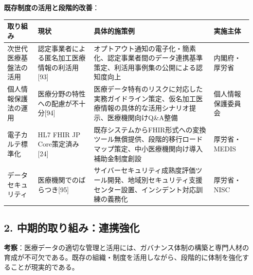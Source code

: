 \documentclass[
  a4paper,
  a4paper,
  11pt]{ltjsbook}
\begin{document}
\textbf{既存制度の活用と段階的改善}：

\begin{longtable}[]{@{}
  >{\raggedright\arraybackslash}p{}
  >{\raggedright\arraybackslash}p{}
  >{\raggedright\arraybackslash}p{}
  >{\raggedright\arraybackslash}p{}@{}}
\toprule\noalign{}
\begin{minipage}[b]{\linewidth}\raggedright
取り組み
\end{minipage} & \begin{minipage}[b]{\linewidth}\raggedright
現状
\end{minipage} & \begin{minipage}[b]{\linewidth}\raggedright
具体的施策例
\end{minipage} & \begin{minipage}[b]{\linewidth}\raggedright
実施主体
\end{minipage} \\
\midrule\noalign{}
\endhead
\bottomrule\noalign{}
\endlastfoot
次世代医療基盤法の活用 &
認定事業者による匿名加工医療情報の利活用{[}93{]} &
オプトアウト通知の電子化・簡素化、認定事業者間のデータ連携基準策定、利活用事例集の公開による認知度向上
& 内閣府・厚労省 \\
個人情報保護法の運用 & 医療分野の特性への配慮が不十分{[}94{]} &
医療データ特有のリスクに対応した実務ガイドライン策定、仮名加工医療情報の具体的な活用シナリオ提示、医療機関向けQ\&A整備
& 個人情報保護委員会 \\
電子カルテ標準化 & HL7 FHIR JP Core策定済み{[}24{]} &
既存システムからFHIR形式への変換ツール無償提供、段階的移行ロードマップ策定、中小医療機関向け導入補助金制度創設
& 厚労省・MEDIS \\
データセキュリティ & 医療機関でのばらつき{[}95{]} &
サイバーセキュリティ成熟度評価ツール開発、地域別セキュリティ支援センター設置、インシデント対応訓練の義務化
& 厚労省・NISC \\
\end{longtable}

\subsection{2.
中期的取り組み：連携強化}\label{ux4e2dux671fux7684ux53d6ux308aux7d44ux307fux9023ux643aux5f37ux5316}

\textbf{考察}：医療データの適切な管理と活用には、ガバナンス体制の構築と専門人材の育成が不可欠である。既存の組織・制度を活用しながら、段階的に体制を強化することが現実的である。
\end{document}
